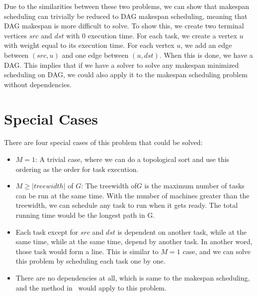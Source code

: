 \documentclass{article}
\begin{document}
Due to the similarities between these two problems, we can show that makespan
scheduling can trivially be reduced to DAG makespan scheduling, meaning
that DAG makespan is more difficult to solve. To show this,
we create two terminal vertices $src$ and $dst$ with 0 execution time. For each
task, we create a vertex $u$ with weight equal to its execution time. For each
vertex $u$, we add an edge between $(src,u)$ and one edge between $(u,dst)$.
When this is done, we have a DAG.
This implies that if we have a solver to solve any makespan minimized
scheduling on DAG, we could also apply it to the makespan scheduling problem
without dependencies.

\section{Special Cases}
There are four special cases of this problem that could be solved:
\begin{itemize}
\item $M = 1$: A trivial case, where we can do a topological sort and use this
ordering as the order for task execution.
  \item $M \geq |treewidth|$ of $G$: The treewidth of$G$ is the maximum 
  number of tasks can be run at the same time. With the number of machines 
  greater than the treewidth, we can schedule any task to run when it 
  gets ready. The total running time would be the longest path in G.
\item Each task except for $src$ and $dst$ is dependent on another task,
while at the same time, while at the same time, depend by another task.
In another word, those task would form a line. This is similar to $M=1$
case, and we can solve this problem by scheduling each task one by one.
\item There are no dependencies at all, which is same to the makespan
scheduling, and the method in~\cite{mnich2015scheduling} would apply
to this problem.
\end{itemize}



\end{document}
